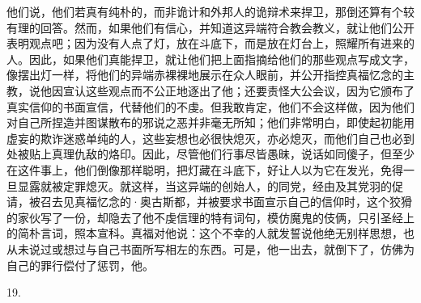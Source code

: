 他们说，他们若真有纯朴的，而非诡计和外邦人的诡辩术来捍卫，那倒还算有个较有理的回答。然而，如果他们有信心，并知道这异端符合教会教义，就让他们公开表明观点吧；因为没有人点了灯，放在斗底下，而是放在灯台上，照耀所有进来的人。因此，如果他们真能捍卫，就让他们把上面指摘给他们的那些观点写成文字，像摆出灯一样，将他们的异端赤裸裸地展示在众人眼前，并公开指控真福忆念的主教，说他因宣认这些观点而不公正地逐出了他；还要责怪大公会议，因为它颁布了真实信仰的书面宣信，代替他们的不虔。但我敢肯定，他们不会这样做，因为他们对自己所捏造并图谋散布的邪说之恶并非毫无所知；他们非常明白，即使起初能用虚妄的欺诈迷惑单纯的人，这些妄想也必很快熄灭，亦必熄灭，而他们自己也必到处被贴上真理仇敌的烙印。因此，尽管他们行事尽皆愚昧，说话如同傻子，但至少在这件事上，他们倒像那样聪明，把灯藏在斗底下，好让人以为它在发光，免得一旦显露就被定罪熄灭。就这样，当这异端的创始人，的同党，经由及其党羽的促请，被召去见真福忆念的·奥古斯都，并被要求书面宣示自己的信仰时，这个狡猾的家伙写了一份，却隐去了他不虔信理的特有词句，模仿魔鬼的伎俩，只引圣经上的简朴言词，照本宣科。真福对他说：这个不幸的人就发誓说他绝无别样思想，也从未说过或想过与自己书面所写相左的东西。可是，他一出去，就倒下了，仿佛为自己的罪行偿付了惩罚，他。\par

19. \par

